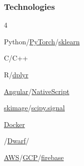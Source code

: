 \documentclass{article}
\newenvironment{mylist}[2]{
  \subsubsection*{#1}
  \begin{multicols}{#2}
  \small
  \begin{list}{}{}
   \setlength{\topsep}{0pt}
   \setlength{\itemsep}{1pt}
   \setlength{\parskip}{0pt}
   \setlength{\parsep}{0pt}}{\end{list}\end{multicols}\normalsize}
\def\bsp{-.3in}
\begin{document}
\begin{mylist}{Technologies}{4}
\item Python/\href{https://pytorch.org/}{PyTorch}/\href{https://scikit-learn.org/stable/}{sklearn}
\item C/C++
\item R/\href{https://dplyr.tidyverse.org/}{dplyr}
\item \href{https://angular.io/}{Angular}/\href{https://nativescript.org/}{NativeScript}
\item \href{https://scikit-image.org/}{skimage}/\href{https://scipy.github.io/devdocs/reference/signal.html#module-scipy.signal}{scipy.signal}
\item \href{https://www.docker.com/}{Docker}
\item \href{https://pypi.org/project/gtirb/}{}/\href{https://dwarfstd.org/}{Dwarf}/\href{https://pypi.org/project/asts/}{}
\item \href{https://aws.amazon.com/}{AWS}/\href{https://cloud.google.com/}{GCP}/\href{https://firebase.google.com/}{firebase}
\end{mylist}

\newcommand{\BSec}[1]{
\noindent{\hspace{\bsp} \LARGE{\bf #1}{ }\hrulefill}}
\TabPositions{2.1in} %
\def\tabb{\tab- }  %

\BSec{}%
\end{document}
